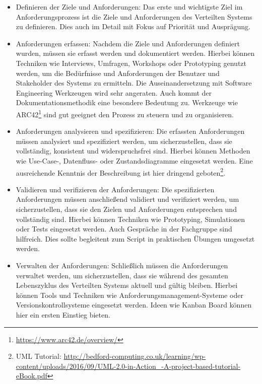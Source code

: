 \begin{itemize}   
\item Definieren der Ziele und Anforderungen: Das erste und wichtigste Ziel im Anforderungsprozess ist die Ziele und Anforderungen des Verteilten Systems zu definieren. Dies auch im Detail mit Fokus auf Priorität und  Ausprägung.

\item Anforderungen erfassen: Nachdem die Ziele und Anforderungen definiert wurden, müssen sie erfasst werden und dokumentiert werden. Hierbei können Techniken wie Interviews, Umfragen, Workshops oder Prototyping genutzt werden, um die Bedürfnisse und Anforderungen der Benutzer und Stakeholder des Systems zu ermitteln. Die Auseinandersetzung mit Software Engineering Werkzeugen wird sehr angeraten. Auch kommt der Dokumentationsmethodik eine besondere Bedeutung zu. Werkzeuge wie ARC42\footnote{\url{https://www.arc42.de/overview/}} sind gut geeignet den Prozess zu steuern und zu organisieren. 

\item Anforderungen analysieren und spezifizieren: Die erfassten Anforderungen müssen analysiert und spezifiziert werden, um sicherzustellen, dass sie vollständig, konsistent und widerspruchsfrei sind. Hierbei können Methoden wie Use-Case-, Datenfluss- oder Zustandsdiagramme eingesetzt werden. Eine ausreichende Kenntnis der Beschreibung ist hier dringend geboten\footnote{UML Tutorial: \url{ http://bedford-computing.co.uk/learning/wp-content/uploads/2016/09/UML-2.0-in-Action_-A-project-based-tutorial-eBook.pdf}}. 

\item Validieren und verifizieren der Anforderungen: Die spezifizierten Anforderungen müssen anschließend validiert und verifiziert werden, um sicherzustellen, dass sie den Zielen und Anforderungen entsprechen und vollständig sind. Hierbei können Techniken wie Prototyping, Simulationen oder Tests eingesetzt werden. Auch Gespräche in der Fachgruppe sind hilfreich. Dies sollte begleitent zum Script in praktischen Übungen umgesetzt werden.

\item Verwalten der Anforderungen: Schließlich müssen die Anforderungen verwaltet werden, um sicherzustellen, dass sie während des gesamten Lebenszyklus des Verteilten Systems aktuell und gültig bleiben. Hierbei können Tools und Techniken wie Anforderungsmanagement-Systeme oder Versionskontrollsysteme eingesetzt werden. Ideen wie Kanban Board können hier ein ersten Einstieg bieten.
\end{itemize}   

